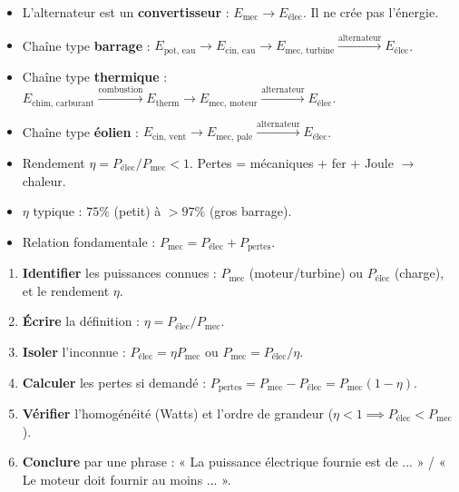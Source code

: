 \documentclass[11pt]{article}
\begin{document}
\begin{aretenir}
\begin{itemize}
    \item L'alternateur est un \textbf{convertisseur} : $E_{\text{mec}} \to E_{\text{élec}}$. Il ne crée pas l'énergie.
    \item Chaîne type \textbf{barrage} : $E_{\text{pot, eau}} \to E_{\text{cin, eau}} \to E_{\text{mec, turbine}} \xrightarrow{\text{alternateur}} E_{\text{élec}}$.
    \item Chaîne type \textbf{thermique} : $E_{\text{chim, carburant}} \xrightarrow{\text{combustion}} E_{\text{therm}} \to E_{\text{mec, moteur}} \xrightarrow{\text{alternateur}} E_{\text{élec}}$.
    \item Chaîne type \textbf{éolien} : $E_{\text{cin, vent}} \to E_{\text{mec, pale}} \xrightarrow{\text{alternateur}} E_{\text{élec}}$.
    \item Rendement $\eta = P_{\text{élec}} / P_{\text{mec}} < 1$. Pertes = mécaniques + fer + Joule $\to$ chaleur.
    \item $\eta$ typique : $75\%$ (petit) à $> 97\%$ (gros barrage).
    \item Relation fondamentale : $P_{\text{mec}} = P_{\text{élec}} + P_{\text{pertes}}$.
\end{itemize}
\end{aretenir}

\begin{methode}
\begin{enumerate}
    \item \textbf{Identifier} les puissances connues : $P_{\text{mec}}$ (moteur/turbine) ou $P_{\text{élec}}$ (charge), et le rendement $\eta$.
    \item \textbf{Écrire} la définition : $\eta = P_{\text{élec}} / P_{\text{mec}}$.
    \item \textbf{Isoler} l'inconnue : $P_{\text{élec}} = \eta P_{\text{mec}}$ ou $P_{\text{mec}} = P_{\text{élec}} / \eta$.
    \item \textbf{Calculer} les pertes si demandé : $P_{\text{pertes}} = P_{\text{mec}} - P_{\text{élec}} = P_{\text{mec}}(1-\eta)$.
    \item \textbf{Vérifier} l'homogénéité (Watts) et l'ordre de grandeur ($\eta < 1 \implies P_{\text{élec}} < P_{\text{mec}}$).
    \item \textbf{Conclure} par une phrase : « La puissance électrique fournie est de ... » / « Le moteur doit fournir au moins ... ».
\end{enumerate}
\end{methode}
\end{document}
